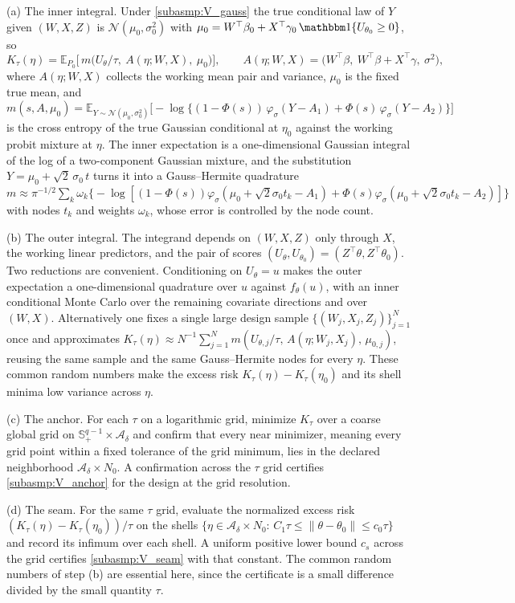 \documentclass[11pt]{article}
\theoremstyle{definition}
\theoremstyle{plain}
\newcommand{\E}{\mathbb{E}}
\begin{document}
(a) The inner integral. Under \ref{subasmp:V_gauss} the true conditional law of $Y$ given $(W,X,Z)$ is $\mathcal N(\mu_0,\sigma_0^2)$ with $\mu_0=W^\top\beta_0+X^\top\gamma_0\,\mathbbm 1\{U_{\theta_0}\ge0\}$, so
\[
K_\tau(\eta)=\E_{P_0}\big[\,m\big(U_\theta/\tau,\ A(\eta;W,X),\ \mu_0\big)\big],
\qquad
A(\eta;W,X)=\big(W^\top\beta,\ W^\top\beta+X^\top\gamma,\ \sigma^2\big),
\]
where $A(\eta;W,X)$ collects the working mean pair and variance, $\mu_0$ is the fixed true mean, and
\[
m(s,A,\mu_0)=\E_{Y\sim\mathcal N(\mu_0,\sigma_0^2)}\Big[-\log\big\{(1-\Phi(s))\,\varphi_{\sigma}(Y-A_1)+\Phi(s)\,\varphi_{\sigma}(Y-A_2)\big\}\Big]
\]
is the cross entropy of the true Gaussian conditional at $\eta_0$ against the working probit mixture at $\eta$. The inner expectation is a one-dimensional Gaussian integral of the log of a two-component Gaussian mixture, and the substitution $Y=\mu_0+\sqrt2\,\sigma_0\,t$ turns it into a Gauss--Hermite quadrature $m\approx\pi^{-1/2}\sum_k \omega_k\big\{-\log[(1-\Phi(s))\varphi_{\sigma}(\mu_0+\sqrt2\sigma_0 t_k-A_1)+\Phi(s)\varphi_{\sigma}(\mu_0+\sqrt2\sigma_0 t_k-A_2)]\big\}$ with nodes $t_k$ and weights $\omega_k$, whose error is controlled by the node count.

(b) The outer integral. The integrand depends on $(W,X,Z)$ only through $X$, the working linear predictors, and the pair of scores $(U_\theta,U_{\theta_0})=(Z^\top\theta,Z^\top\theta_0)$. Two reductions are convenient. Conditioning on $U_\theta=u$ makes the outer expectation a one-dimensional quadrature over $u$ against $f_\theta(u)$, with an inner conditional Monte Carlo over the remaining covariate directions and over $(W,X)$. Alternatively one fixes a single large design sample $\{(W_j,X_j,Z_j)\}_{j=1}^N$ once and approximates $K_\tau(\eta)\approx N^{-1}\sum_{j=1}^N m(U_{\theta,j}/\tau,\,A(\eta;W_j,X_j),\,\mu_{0,j})$, reusing the same sample and the same Gauss--Hermite nodes for every $\eta$. These common random numbers make the excess risk $K_\tau(\eta)-K_\tau(\eta_0)$ and its shell minima low variance across $\eta$.

(c) The anchor. For each $\tau$ on a logarithmic grid, minimize $K_\tau$ over a coarse global grid on $\mathbb S^{q-1}_+\times\mathcal A_\delta$ and confirm that every near minimizer, meaning every grid point within a fixed tolerance of the grid minimum, lies in the declared neighborhood $\mathcal A_\delta\times N_0$. A confirmation across the $\tau$ grid certifies \ref{subasmp:V_anchor} for the design at the grid resolution.

(d) The seam. For the same $\tau$ grid, evaluate the normalized excess risk $(K_\tau(\eta)-K_\tau(\eta_0))/\tau$ on the shells $\{\eta\in\mathcal A_\delta\times N_0:\,C_1\tau\le\|\theta-\theta_0\|\le c_0\tau\}$ and record its infimum over each shell. A uniform positive lower bound $c_s$ across the grid certifies \ref{subasmp:V_seam} with that constant. The common random numbers of step (b) are essential here, since the certificate is a small difference divided by the small quantity $\tau$.
\end{document}
